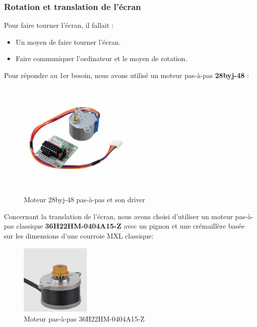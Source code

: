 \subsubsection{Rotation et translation de l'écran}
Pour faire tourner l'écran, il fallait :
\begin{itemize}
    \item Un moyen de faire tourner l'écran.
    \item Faire communiquer l'ordinateur et le moyen de rotation.
\end{itemize}
Pour répondre au 1er besoin, nous avons utilisé un moteur pas-à-pas \textbf{28byj-48} :
\begin{figure}[H]
    \centering
    \includegraphics[width=0.5\textwidth,trim = {1cm 3cm 1cm 3cm},clip]{assets/figures/ameliorations/stepper.jpeg}
    \caption[Moteur 28byj-48 pas-à-pas et son driver]{Moteur 28byj-48 pas-à-pas et son driver \autocite{photo_28byj-48}}
    \label{fig:Photo_moteur_28byj-48}
\end{figure}
Concernant la translation de l'écran, nous avons choisi d'utiliser un moteur pas-à-pas classique \textbf{36H22HM-0404A15-Z} avec un pignon et une crémaillère basée sur les
dimensions d'une courroie MXL classique\cite{dimensions_courroies_mxl}\footnotemark :
\begin{figure}[H]
    \centering
    \includegraphics[width=0.3\textwidth]{assets/figures/ameliorations/36H22HM-0404A15-Z.png}
    \caption[Moteur 36H22HM-0404A15-Z]{Moteur pas-à-pas 36H22HM-0404A15-Z\autocite{moteur_translation_site}\footnotemark}
\end{figure}

